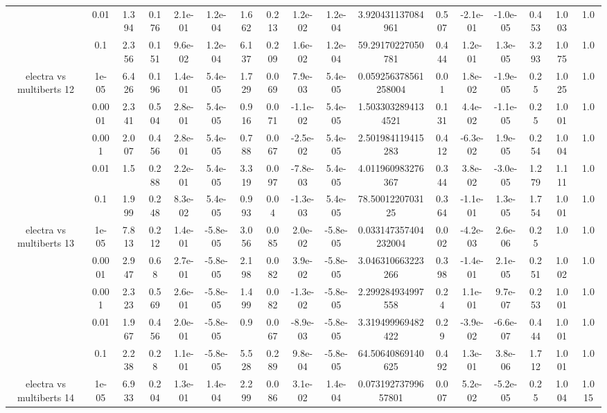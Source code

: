 \begin{tabular}{|c|c|c|c|c|c|c|c|c|c|c|c|c|c|c|c|c|}
 & 0.01 & 1.394 & 0.176 & 2.1e-01 & 1.2e-04 & 1.662 & 0.213 & 1.2e-02 & 1.2e-04 & 3.920431137084961 & 0.507 & -2.1e-01 & -1.0e-05 & 0.453 & 1.003 & 1.0 \\
 & 0.1 & 2.356 & 0.151 & 9.6e-02 & 1.2e-04 & 6.137 & 0.209 & 1.6e-02 & 1.2e-04 & 59.29170227050781 & 0.444 & 1.2e-01 & 1.3e-05 & 3.293 & 1.075 & 1.0 \\
\hline
\multirow{5}{*}{electra  vs multiberts 12} & 1e-05 & 6.426 & 0.196 & 1.4e-01 & 5.4e-05 & 1.729 & 0.069 & 7.9e-03 & 5.4e-05 & 0.059256378561258004 & 0.01 & 1.8e-02 & -1.9e-05 & 0.25 & 1.025 & 1.0 \\
 & 0.0001 & 2.341 & 0.504 & 2.8e-01 & 5.4e-05 & 0.916 & 0.071 & -1.1e-02 & 5.4e-05 & 1.5033032894134521 & 0.131 & 4.4e-02 & -1.1e-05 & 0.25 & 1.001 & 1.0 \\
 & 0.001 & 2.007 & 0.456 & 2.8e-01 & 5.4e-05 & 0.788 & 0.067 & -2.5e-02 & 5.4e-05 & 2.501984119415283 & 0.412 & -6.3e-02 & 1.9e-05 & 0.254 & 1.004 & 1.0 \\
 & 0.01 & 1.5 & 0.288 & 2.2e-01 & 5.4e-05 & 3.319 & 0.097 & -7.8e-03 & 5.4e-05 & 4.011960983276367 & 0.344 & 3.8e-02 & -3.0e-05 & 1.279 & 1.111 & 1.0 \\
 & 0.1 & 1.999 & 0.248 & 8.3e-02 & 5.4e-05 & 0.993 & 0.04 & -1.3e-03 & 5.4e-05 & 78.5001220703125 & 0.364 & -1.1e-01 & 1.3e-05 & 1.754 & 1.001 & 1.0 \\
\hline
\multirow{5}{*}{electra  vs multiberts 13} & 1e-05 & 7.813 & 0.212 & 1.4e-01 & -5.8e-05 & 3.056 & 0.085 & 2.0e-02 & -5.8e-05 & 0.033147357404232004 & 0.002 & -4.2e-03 & 2.6e-06 & 0.25 & 1.0 & 1.0 \\
 & 0.0001 & 2.947 & 0.68 & 2.7e-01 & -5.8e-05 & 2.198 & 0.082 & 3.9e-02 & -5.8e-05 & 3.046310663223266 & 0.398 & -1.4e-01 & 2.1e-05 & 0.251 & 1.002 & 1.0 \\
 & 0.001 & 2.323 & 0.569 & 2.6e-01 & -5.8e-05 & 1.499 & 0.082 & -1.3e-02 & -5.8e-05 & 2.299284934997558 & 0.24 & 1.1e-01 & 9.7e-07 & 0.253 & 1.001 & 1.0 \\
 & 0.01 & 1.967 & 0.456 & 2.0e-01 & -5.8e-05 & 0.9 & 0.067 & -8.9e-03 & -5.8e-05 & 3.319499969482422 & 0.29 & -3.9e-02 & -6.6e-07 & 0.444 & 1.001 & 1.0 \\
 & 0.1 & 2.238 & 0.28 & 1.1e-01 & -5.8e-05 & 5.528 & 0.289 & 9.8e-04 & -5.8e-05 & 64.50640869140625 & 0.492 & 1.3e-01 & 3.8e-06 & 1.712 & 1.001 & 1.0 \\
\hline
\multirow{5}{*}{electra  vs multiberts 14} & 1e-05 & 6.933 & 0.204 & 1.3e-01 & 1.4e-04 & 2.299 & 0.086 & 3.1e-02 & 1.4e-04 & 0.07319273799657801 & 0.007 & 5.2e-02 & -5.2e-05 & 0.25 & 1.004 & 1.015 \\

\end{tabular}
